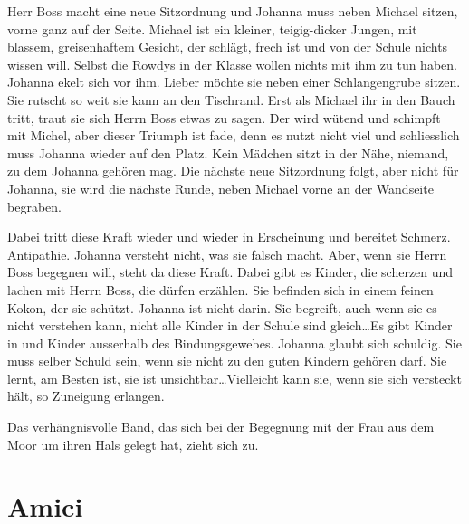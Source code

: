 Herr Boss macht eine neue Sitzordnung und Johanna muss neben Michael sitzen, vorne ganz auf der Seite. Michael ist ein kleiner, teigig-dicker Jungen, mit blassem, greisenhaftem Gesicht, der schlägt, frech ist und von der Schule nichts wissen will. Selbst die Rowdys in der Klasse wollen nichts mit ihm zu tun haben. Johanna ekelt sich vor ihm. Lieber möchte sie neben einer Schlangengrube sitzen. Sie rutscht so weit sie kann an den Tischrand. Erst als Michael ihr in den Bauch tritt, traut sie sich Herrn Boss etwas zu sagen. Der wird wütend und schimpft mit Michel, aber dieser Triumph ist fade, denn es nutzt nicht viel und schliesslich muss Johanna wieder auf den Platz. Kein Mädchen sitzt in der Nähe, niemand, zu dem Johanna gehören mag. Die nächste neue Sitzordnung folgt, aber nicht für Johanna, sie wird die nächste Runde, neben Michael vorne an der Wandseite begraben.

Dabei tritt diese Kraft wieder und wieder in Erscheinung und bereitet Schmerz. Antipathie. Johanna versteht nicht, was sie falsch macht. Aber, wenn sie Herrn Boss begegnen will, steht da diese Kraft. Dabei gibt es Kinder, die scherzen und lachen mit Herrn Boss, die dürfen erzählen. Sie befinden sich in einem feinen Kokon, der sie schützt. Johanna ist nicht darin. Sie begreift, auch wenn sie es nicht verstehen kann, nicht alle Kinder in der Schule sind gleich\dots Es gibt Kinder in und Kinder ausserhalb des Bindungsgewebes. Johanna glaubt sich schuldig. Sie muss selber Schuld sein, wenn sie nicht zu den guten Kindern gehören darf. Sie lernt, am Besten ist, sie ist unsichtbar\dots Vielleicht kann sie, wenn sie sich versteckt hält, so Zuneigung erlangen.

Das verhängnisvolle Band, das sich bei der Begegnung mit der Frau aus dem Moor um ihren Hals gelegt hat, zieht sich zu.



\section*{Amici}




